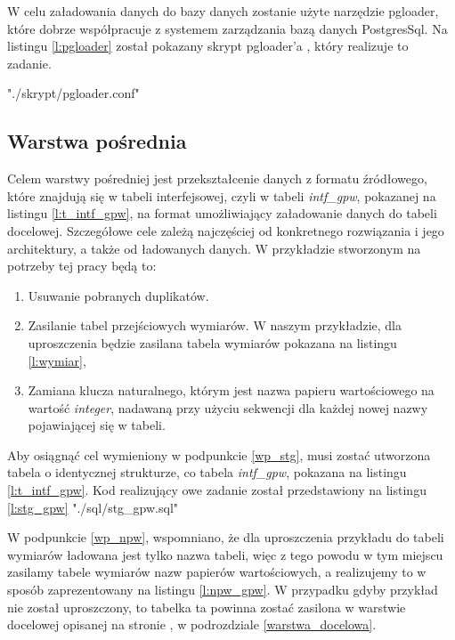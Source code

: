 W celu załadowania danych do bazy danych zostanie użyte narzędzie pgloader,
 które dobrze współpracuje z systemem zarządzania bazą danych PostgresSql.
Na listingu \ref{l:pgloader} został pokazany skrypt pgloader'a , który realizuje to zadanie.

 {"./skrypt/pgloader.conf"}


\subsection{Warstwa pośrednia}

Celem warstwy pośredniej jest przekształcenie danych z formatu źródłowego, które znajdują się w tabeli interfejsowej,
czyli w tabeli \textit{intf\_gpw}, pokazanej na listingu \ref{l:t_intf_gpw},
na format umożliwiający załadowanie danych do tabeli docelowej.
Szczegółowe cele zależą najczęściej od konkretnego rozwiązania i jego architektury,
 a także od ładowanych danych. 
W przykładzie stworzonym na potrzeby tej pracy będą to:
\begin{enumerate}
 \item \label{wp_stg}
   Usuwanie pobranych duplikatów.
 \item \label{wp_npw}
  Zasilanie tabel przejściowych wymiarów.
  W naszym przykładzie, dla uproszczenia będzie zasilana tabela wymiarów pokazana na listingu \ref{l:wymiar},
 \item  \label{wp_promo}
  Zamiana klucza naturalnego, 
   którym jest nazwa papieru wartościowego na wartość \textit{integer}, 
   nadawaną przy użyciu  sekwencji dla każdej nowej nazwy pojawiającej się w tabeli.
\end{enumerate}

Aby osiągnąć cel wymieniony w  podpunkcie \ref{wp_stg}, 
 musi zostać utworzona tabela  o identycznej strukturze, co tabela \textit{intf\_gpw}, pokazana na listingu \ref{l:t_intf_gpw}.
Kod realizujący owe zadanie został przedstawiony na listingu \ref{l:stg_gpw}
 {"./sql/stg_gpw.sql"}


W podpunkcie \ref{wp_npw},  wspomniano, 
 że dla uproszczenia przykładu do tabeli wymiarów ładowana jest tylko nazwa tabeli, 
 więc z tego powodu w tym miejscu zasilamy tabele wymiarów nazw papierów wartościowych, 
 a realizujemy to w sposób zaprezentowany na listingu \ref{l:npw_gpw}.
W przypadku gdyby przykład nie został uproszczony, to tabelka ta powinna zostać zasilona w warstwie docelowej opisanej na stronie
\pageref{warstwa_docelowa}, w podrozdziale  \ref{warstwa_docelowa}.

